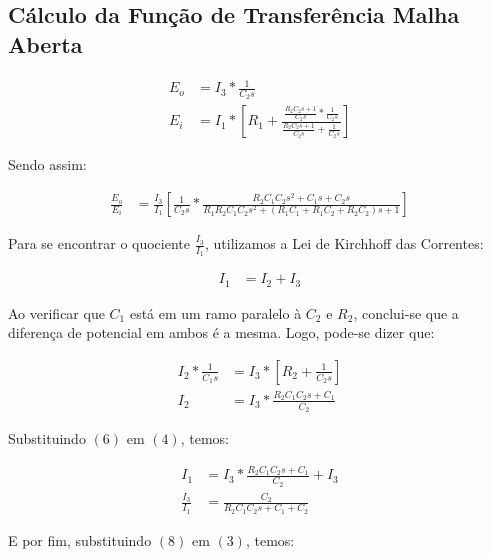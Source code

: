\documentclass[a4paper]{article}
\begin{document}
	\subsection{Cálculo da Função de Transferência Malha Aberta}
	\vspace{1em}

	\begin{align}
	E_o &= I_3*\frac{1}{C_2s}\\
	E_i &= I_1*[R_1+\frac{\frac{R_2C_2s+1}{C_2s} * \frac{1}{C_2s}}{\frac{R_2C_2s+1}{C_2s}+ \frac{1}{C_2s}}]
	\end{align}
	\vspace{1em}
	\par Sendo assim: 
	
	\begin{align}
	\frac{E_o}{E_i} &= \frac{I_3}{I_1}[\frac{1}{C_2s}*\frac{R_2C_1C_2s^2+C_1s+C_2s}{R_1R_2C_1C_2s^2+(R_1C_1+R_1C_2+R_2C_2)s+1}]
	\end{align}
	\vspace{0.3em}
	\par Para se encontrar o quociente $\frac{I_3}{I_1}$, utilizamos a Lei de Kirchhoff das Correntes: 
	
	\begin{align}
	I_1 &= I_2+I_3
	\end{align}
	
	\vspace{0.3em}
	\par Ao verificar que $C_1$ está em um ramo paralelo à $C_2$ e $R_2$, conclui-se que a diferença de potencial em ambos é a mesma. Logo, pode-se dizer que:
	
	\begin{align}
	I_2*\frac{1}{C_1s} &= I_3*[R_2+\frac{1}{C_2s}]	\\
	I_2 &= I_3*\frac{R_2C_1C_2s+C_1}{C_2}
	\end{align}
	
	\vspace{0.3em}
	\par Substituindo $(6)$ em $(4)$, temos:
	
	\begin{align}
	I_1 &= I_3*\frac{R_2C_1C_2s+C_1}{C_2} + I_3\\
	\frac{I_3}{I_1} &= \frac{C_2}{R_2C_1C_2s+C_1+C_2}
	\end{align}
	
	\vspace{0.3em}
	\par E por fim, substituindo $(8)$ em $(3)$, temos:
	
\end{document}
